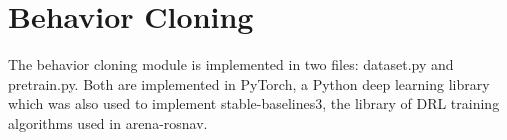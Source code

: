 \section{Behavior Cloning}
The behavior cloning module is implemented in two files: dataset.py and pretrain.py. Both are implemented in PyTorch, a Python deep learning library which was also used to implement stable-baselines3, the library of DRL training algorithms used in arena-rosnav.

